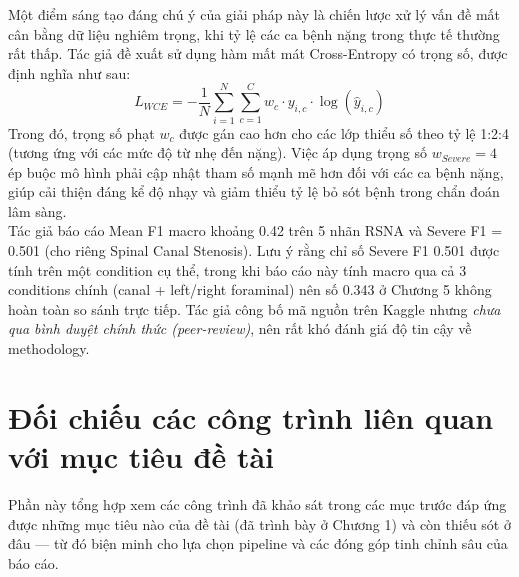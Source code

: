 Một điểm sáng tạo đáng chú ý của giải pháp này là chiến lược xử lý vấn đề mất cân bằng dữ liệu nghiêm trọng, khi tỷ lệ các ca bệnh nặng trong thực tế thường rất thấp. Tác giả đề xuất sử dụng hàm mất mát Cross-Entropy có trọng số, được định nghĩa như sau:
\begin{equation}
    L_{WCE} = - \frac{1}{N} \sum_{i=1}^{N} \sum_{c=1}^{C} w_c \cdot y_{i,c} \cdot \log(\hat{y}_{i,c})
\end{equation}
Trong đó, trọng số phạt $w_c$ được gán cao hơn cho các lớp thiểu số theo tỷ lệ 1:2:4 (tương ứng với các mức độ từ nhẹ đến nặng). Việc áp dụng trọng số $w_{Severe} = 4$ ép buộc mô hình phải cập nhật tham số mạnh mẽ hơn đối với các ca bệnh nặng, giúp cải thiện đáng kể độ nhạy và giảm thiểu tỷ lệ bỏ sót bệnh trong chẩn đoán lâm sàng.\\

Tác giả báo cáo Mean F1 macro khoảng 0.42 trên 5 nhãn RSNA và Severe F1 = 0.501 (cho riêng Spinal Canal Stenosis). Lưu ý rằng chỉ số Severe F1 0.501 được tính trên một condition cụ thể, trong khi báo cáo này tính macro qua cả 3 conditions chính (canal + left/right foraminal) nên số 0.343 ở Chương 5 không hoàn toàn so sánh trực tiếp. Tác giả công bố mã nguồn trên Kaggle nhưng \emph{chưa qua bình duyệt chính thức (peer-review)}, nên rất khó đánh giá độ tin cậy về methodology.

\section{Đối chiếu các công trình liên quan với mục tiêu đề tài}
Phần này tổng hợp xem các công trình đã khảo sát trong các mục trước đáp ứng được những mục tiêu nào của đề tài (đã trình bày ở Chương 1) và còn thiếu sót ở đâu --- từ đó biện minh cho lựa chọn pipeline và các đóng góp tinh chỉnh sâu của báo cáo.

